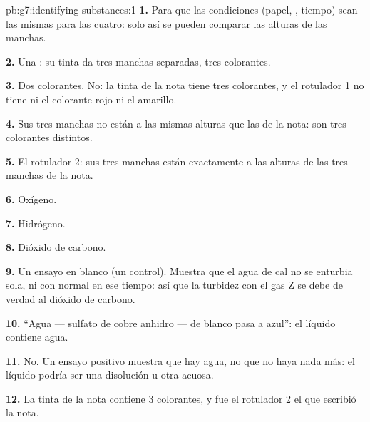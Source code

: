 \begin{solution}{pb:g7:identifying-substances:1}
\textbf{1.} Para que las condiciones (papel, , tiempo) sean
las mismas para las cuatro: solo así se pueden comparar las alturas de
las manchas.

\textbf{2.} Una : su tinta da tres manchas separadas, tres
colorantes.

\textbf{3.} Dos colorantes. No: la tinta de la nota tiene tres
colorantes, y el rotulador 1 no tiene ni el colorante rojo ni el
amarillo.

\textbf{4.} Sus tres manchas no están a las mismas alturas que las de la
nota: son tres colorantes distintos.

\textbf{5.} El rotulador 2: sus tres manchas están exactamente a las
alturas de las tres manchas de la nota.

\textbf{6.} Oxígeno.

\textbf{7.} Hidrógeno.

\textbf{8.} Dióxido de carbono.

\textbf{9.} Un ensayo en blanco (un control). Muestra que el agua de cal
no se enturbia sola, ni con  normal en ese tiempo: así que la
turbidez con el gas Z se debe de verdad al dióxido de carbono.

\textbf{10.} ``Agua --- sulfato de cobre anhidro --- de blanco pasa a
azul'': el líquido contiene agua.

\textbf{11.} No. Un ensayo positivo muestra que hay agua, no que no haya
nada más: el líquido podría ser una disolución u otra  acuosa.

\textbf{12.} La tinta de la nota contiene 3 colorantes, y fue el
rotulador 2 el que escribió la nota.
\end{solution}
